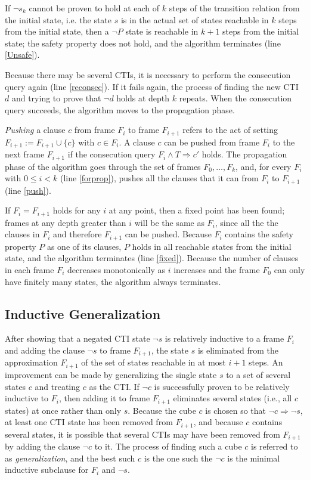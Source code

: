 \documentclass[12pt,a4paper,twoside,openright]{report}
\begin{document}
{{If $\neg s_k$ cannot be proven to hold at each of $k$ steps of
the transition relation from the initial state, i.e. the state $s$ is in the actual
set of states reachable in $k$ steps from the initial state, then a $\neg P$ state
is reachable in $k + 1$ steps from the initial state; the safety property does not
hold, and the algorithm terminates (line \ref{Unsafe}).

Because there may be several CTIs, it is necessary to
perform the consecution query again (line \ref{reconsec}). If it fails again,
the process of finding the new CTI $d$ and trying to
prove that $\neg d$ holds at depth $k$ repeats.
When the consecution query succeeds, the algorithm moves to the propagation phase.

\emph{Pushing} a clause $c$ from frame $F_i$ to frame $F_{i + 1}$ refers to the act
of setting $F_{i + 1} := F_{i + 1} \cup \{ c \}$ with $c \in F_i$.
A clause $c$ can be pushed from frame $F_i$ to the next frame $F_{i + 1}$
if the consecution query $F_i \wedge T \Rightarrow c'$ holds.
The propagation phase of the algorithm goes through the set of frames
$F_0, \ldots, F_k$, and, for every $F_i$ with $0 \leq i < k$ (line \ref{forprop}),
pushes all the clauses that it can from $F_i$ to $F_{i + 1}$ (line \ref{push}).

If $F_i = F_{i + 1}$ holds for any $i$ at any point, then a fixed point has
been found; frames at any depth greater than $i$ will be the
same as $F_i$, since all the the clauses in $F_i$ and therefore $F_{i + 1}$
can be pushed.
Because $F_i$ contains the safety property $P$ as one of its clauses,
$P$ holds in all reachable states from the initial state,
and the algorithm terminates (line \ref{fixed}). Because the number of
clauses in each frame $F_i$ decreases monotonically as $i$ increases and the
frame $F_0$ can only have finitely many states, the algorithm always
terminates.

\subsection{Inductive Generalization}

After showing that a negated CTI state $\neg s$ is relatively inductive to a
frame $F_i$ and adding the clause $\neg s$ to frame $F_{i + 1}$, the state
$s$ is eliminated from the approximation $F_{i + 1}$ of the set of states
reachable in at most $i + 1$ steps. An improvement can be made by generalizing
the single state $s$ to a set of several states $c$ and treating
$c$ as the CTI. If $\neg c$ is successfully proven to be relatively inductive
to $F_i$, then adding it to frame $F_{i + 1}$ eliminates several states (i.e.,
all $c$ states) at once rather than only $s$. Because the cube $c$
is chosen so that $\neg c \Rightarrow \neg s$, at least one CTI state
has been removed from $F_{i + 1}$, and because $c$ contains several states,
it is possible that several CTIs may have been removed from $F_{i + 1}$
by adding the clause $\neg c$ to it. The process of finding such a cube $c$
is referred to as \emph{generalization}, and the best such $c$ is the
one such the $\neg c$ is the minimal inductive subclause for $F_i$ and $\neg s$.

}}
\end{document}
